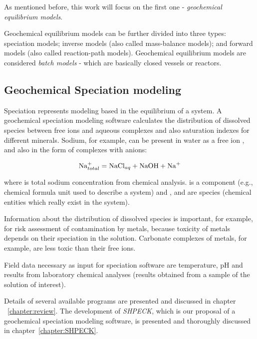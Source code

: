 As mentioned before, this work will focus on the first one - \emph{geochemical equilibrium models}.

Geochemical equilibrium models can be further divided into three types: speciation models; inverse models (also called mass-balance models); and forward models (also called reaction-path models). Geochemical equilibrium models are considered \emph{batch models} - which are basically closed vessels or reactors.

\subsection{Geochemical Speciation modeling}
Speciation represents modeling based in the equilibrium of a system. A geochemical speciation modeling software calculates the distribution of dissolved species between free ions and aqueous complexes and also saturation indexes for different minerals. Sodium, for example, can be present in water as a free ion , and also in the form of complexes with anions:

\begin{equation}
\ce{Na^+}_{total} = \ce{NaCl}_{aq} + \ce{NaOH} + \ce{Na^+}
\end{equation}

where  is total sodium concentration from chemical analysis.  is a component (e.g., chemical formula unit used to describe a system) and ,  and  are species (chemical entities which really exist in the system). 

Information about the distribution of dissolved species is important, for example, for risk assessment of contamination by metals, because toxicity of metals depends on their speciation in the solution. Carbonate complexes of metals, for example, are less toxic than their free ions.

Field data necessary as input for speciation software are temperature, pH and results from laboratory chemical analyses (results obtained from a sample of the solution of interest).

Details of several available programs are presented and discussed in chapter ~\ref{chapter:review}. The development of \emph{SHPECK}, which is our proposal of a geochemical speciation modeling software, is presented and thoroughly discussed in chapter~\ref{chapter:SHPECK}. 

